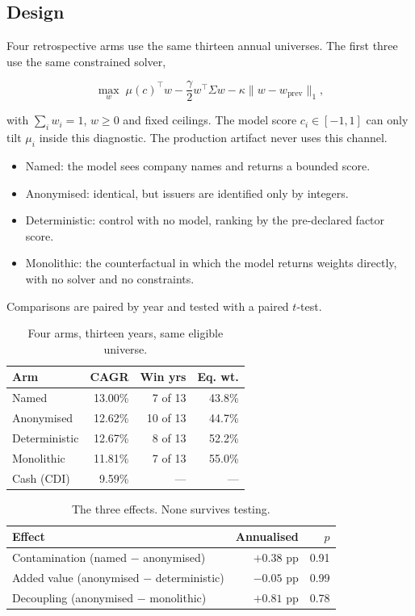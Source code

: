 \documentclass[10pt,conference]{IEEEtran}
\begin{document}
\subsection{Design}

Four retrospective arms use the same thirteen annual universes. The first three use the same constrained solver,

\begin{equation}
\max_w\;\mu(c)^\top w-\frac{\gamma}{2}w^\top\Sigma w-\kappa\lVert w-w_{\mathrm{prev}}\rVert_1,
\end{equation}

with $\sum_iw_i=1$, $w\ge0$ and fixed ceilings. The model score $c_i\in[-1,1]$ can only tilt $\mu_i$ inside this diagnostic. The production artifact never uses this channel.

\begin{itemize}
\item Named: the model sees company names and returns a bounded score.
\item Anonymised: identical, but issuers are identified only by integers.
\item Deterministic: control with no model, ranking by the pre-declared factor score.
\item Monolithic: the counterfactual in which the model returns weights directly, with no solver and no constraints.
\end{itemize}

Comparisons are paired by year and tested with a paired $t$-test.

\begin{table}[t]
\caption{Four arms, thirteen years, same eligible universe.}
\centering
\small
\begin{tabular}{lrrr}
\toprule
Arm & CAGR & Win yrs & Eq. wt. \\
\midrule
Named & 13.00\% & 7 of 13 & 43.8\% \\
Anonymised & 12.62\% & 10 of 13 & 44.7\% \\
Deterministic & 12.67\% & 8 of 13 & 52.2\% \\
Monolithic & 11.81\% & 7 of 13 & 55.0\% \\
\midrule
Cash (CDI) & 9.59\% & --- & --- \\
\bottomrule
\end{tabular}
\label{tab:arms}
\end{table}

\begin{table}[t]
\caption{The three effects. None survives testing.}
\centering
\begin{tabular}{lrr}
\toprule
Effect & Annualised & $p$ \\
\midrule
Contamination (named $-$ anonymised) & $+0.38$ pp & 0.91 \\
Added value (anonymised $-$ deterministic) & $-0.05$ pp & 0.99 \\
Decoupling (anonymised $-$ monolithic) & $+0.81$ pp & 0.78 \\
\bottomrule
\end{tabular}
\label{tab:effects}
\end{table}
\end{document}

